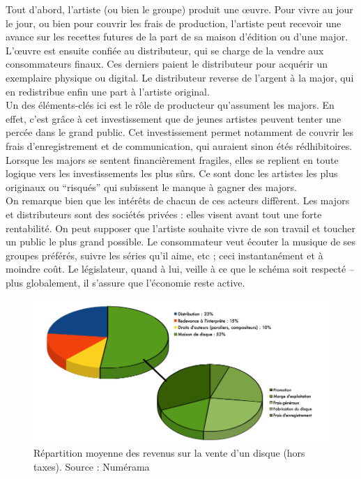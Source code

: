 \documentclass[a4paper]{report}
\begin{document}
	Tout d'abord, l'artiste (ou bien le groupe) produit une œuvre. Pour vivre au jour le jour, ou bien pour couvrir les frais de production, l'artiste peut recevoir une avance sur les recettes futures de la part de sa maison d'édition ou d'une major. L'œuvre est ensuite confiée au distributeur, qui se charge de la vendre aux consommateurs finaux. Ces derniers paient le distributeur pour acquérir un exemplaire physique ou digital. Le distributeur reverse de l'argent à la major, qui en redistribue enfin une part à l'artiste original.\\

	Un des éléments-clés ici est le rôle de producteur qu'assument les majors. En effet, c'est grâce à cet investissement que de jeunes artistes peuvent tenter une percée dans le grand public. Cet investissement permet notamment de couvrir les frais d'enregistrement et de communication, qui auraient sinon étés rédhibitoires. Lorsque les majors se sentent financièrement fragiles, elles se replient en toute logique vers les investissements les plus sûrs. Ce sont donc les artistes les plus originaux ou ``risqués'' qui subissent le manque à gagner des majors.\\

	On remarque bien que les intérêts de chacun de ces acteurs diffèrent. Les majors et distributeurs sont des sociétés privées : elles visent avant tout une forte rentabilité. On peut supposer que l'artiste souhaite vivre de son travail et toucher un public le plus grand possible. Le consommateur veut écouter la musique de ses groupes préférés, suivre les séries qu'il aime, etc ; ceci instantanément et à moindre coût. Le législateur, quand à lui, veille à ce que le schéma soit respecté – plus globalement, il s'assure que l'économie reste active.

	\begin{figure}[ht]
		\includegraphics[width=13cm]{images/repartition-des-revenus.png}
		\caption{Répartition moyenne des revenus sur la vente d'un disque (hors taxes). Source : Numérama}
	\end{figure}
\end{document}
